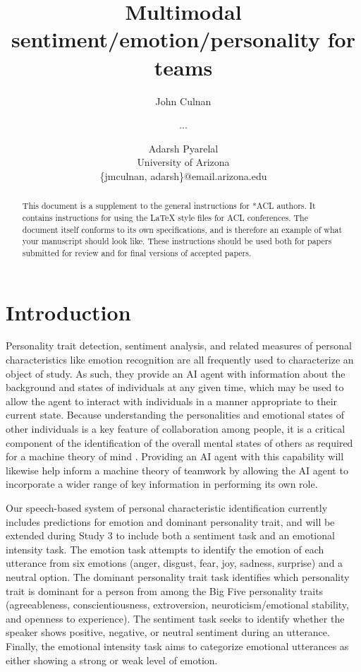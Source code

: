 \documentclass[11pt]{article}
\title{Multimodal sentiment/emotion/personality for teams}
\author{John Culnan \and ... \and Adarsh Pyarelal \\
        University of Arizona \\
        \{jmculnan, adarsh\}@email.arizona.edu}
\begin{document}
\maketitle
\begin{abstract}
This document is a supplement to the general instructions for *ACL authors. It contains instructions for using the \LaTeX{} style files for ACL conferences. 
The document itself conforms to its own specifications, and is therefore an example of what your manuscript should look like.
These instructions should be used both for papers submitted for review and for final versions of accepted papers.
\end{abstract}

\section{Introduction}

Personality trait detection, sentiment analysis, and related measures of
personal characteristics like emotion recognition are all frequently
used to characterize an object of study. As such, they provide an AI agent with
information about the background and states of individuals at any given time,
which may be used to allow the agent to interact with individuals in a manner
appropriate to their current state. Because understanding the personalities and
emotional states of other individuals is a key feature of collaboration among
people, it is a critical component of the identification of the overall mental
states of others as required for a machine theory of mind
\cite{Rabinowitz.ea:2018}. Providing an AI agent with this capability will
likewise help inform a machine theory of teamwork by allowing the AI agent to
incorporate a wider range of key information in performing its own role.

Our speech-based system of personal characteristic identification currently
includes predictions for emotion and dominant personality trait, and will be
extended during Study 3 to include both a sentiment task and an emotional intensity
task. The emotion task attempts to identify the emotion of each utterance from six
emotions (anger, disgust, fear, joy, sadness, surprise) and a neutral option. The
dominant personality trait task identifies which personality trait is dominant for
a person from among the Big Five personality traits (agreeableness, conscientiousness,
extroversion, neuroticism/emotional stability, and openness to experience). The
sentiment task seeks to identify whether the speaker shows positive, negative, or
neutral sentiment during an utterance. Finally, the emotional intensity task aims to
categorize emotional utterances as either showing a strong or weak level of emotion.
\end{document}
